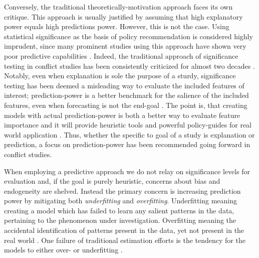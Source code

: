 \documentclass[a4paper]{article}
\begin{document}
Conversely, the traditional theoretically-motivation approach faces its own critique. This approach is usually justified by assuming that high explanatory power equals high predictions power. However, this is not the case. Using statistical significance as the basis of policy recommendation is considered highly imprudent, since many prominent studies using this approach have shown very poor predictive capabilities \citep{Ward_Greenhill_Bakke_2010, Schrodt_2014, chadefaux2017conflict}. Indeed, the traditional approach of significance testing in conflict studies has been consistently criticized for almost two decades \citep{king_zeng_2001b, Ward_Greenhill_Bakke_2010, Goldstone_2010, Schrodt_2014, chadefaux2017conflict}. Notably, even when explanation is sole the purpose of a sturdy, significance testing has been deemed a misleading way to evaluate the included features of interest; prediction-power is a better benchmark for the salience of the included features, even when forecasting is not the end-goal \citep{Ward_Greenhill_Bakke_2010, Schrodt_2014}. The point is, that creating models with actual prediction-power is both a better way to evaluate feature importance and it will provide heuristic tools and powerful policy-guides for real world application \citep[372]{Ward_Greenhill_Bakke_2010}. Thus, whether the specific to goal of a study is explanation or prediction, a focus on prediction-power has been recommended going forward in conflict studies.\par

When employing a predictive approach we do not relay on significance levels for evaluation and, if the goal is purely heuristic, concerns about bias and endogeneity are shelved. Instead the primary concern is increasing prediction power by mitigating both \emph{underfitting} and \emph{overfitting}. Underfitting meaning creating a model which has failed to learn any salient patterns in the data, pertaining to the phenomenon under investigation. Overfitting meaning the accidental identification of patterns present in the data, yet not present in the real world \citep[165-168]{Mcelreath_2018}. One failure of traditional estimation efforts is the tendency for the models to either over- or underfitting \citep[364]{Ward_Greenhill_Bakke_2010}.\par 
\end{document}
